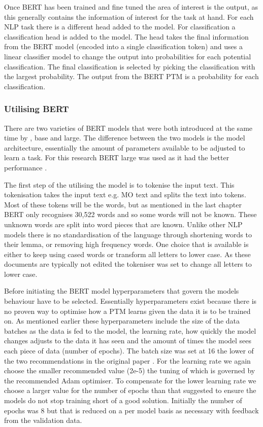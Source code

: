 Once BERT has been trained and fine tuned the area of interest is the output, as this generally contains the information of interest for the task at hand. For each NLP task there is a different head added to the model. For classification a classification head is added to the model. The head takes the final information from the BERT model (encoded into a single classification token) and uses a linear classifier model to change the output into probabilities for each potential classification. The final classification is selected by picking the classification with the largest probability. The output from the BERT PTM is a probability for each classification.

\subsubsection{Utilising BERT } There are two varieties of BERT models that were both introduced at the same time by \parencite{devlin2018bert}, base and large. The difference between the two models is the model architecture, essentially the amount of parameters available to be adjusted to learn a task. For this research BERT large was used as it had the better performance \parencite{devlin2018bert}.

The first step of the utilising the model is to tokenise the input text. This tokenisation takes the input text e.g. MO text and splits the text into tokens. Most of these tokens will be the words, but as mentioned in the last chapter BERT only recognises 30,522 words and so some words will not be known. These unknown words are split into word pieces that are known. Unlike other NLP models there is no standardisation of the language through shortening words to their lemma, or removing high frequency words. One choice that is available is either to keep using cased words or transform all letters to lower case. As these documents are typically not edited the tokeniser was set to change all letters to lower case.

Before initiating the BERT model  hyperparameters that govern the models behaviour have to be selected. Essentially hyperparameters exist because there is no proven way to optimise how a PTM learns given the data it is to be trained on. As mentioned earlier these hyperparameters include the size of the data batches as the data is fed to the model, the learning rate, how quickly the model changes adjusts to the data it has seen and the amount of times the model sees each piece of data (number of epochs). The batch size was set at 16 the lower of the two recommendations in the original paper \parencite{devlin2018bert}. For the learning rate we again choose the smaller recommended value (2e-5) the tuning of which is governed by the recommended Adam optimiser. To compensate for the lower learning rate we choose a larger value for the number of epochs than that suggested to ensure the models do not stop training short of a good solution. Initially the number of epochs was 8 but that is reduced on a per model basis as necessary with feedback from the validation data.

